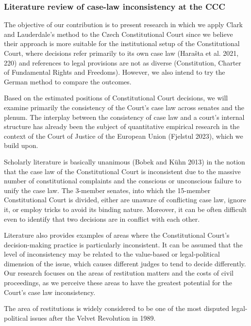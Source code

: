 \documentclass[
  11pt,
]{article}
\begin{document}
\hypertarget{literature-review-of-case-law-inconsistency-at-the-ccc}{%
\subsubsection{Literature review of case-law inconsistency at the
CCC}\label{literature-review-of-case-law-inconsistency-at-the-ccc}}

The objective of our contribution is to present research in which we
apply Clark and Lauderdale's method to the Czech Constitutional Court
since we believe their approach is more suitable for the institutional
setup of the Constitutional Court, where decisions refer primarily to
its own case law (Harašta et al. 2021, 220) and references to legal
provisions are not as diverse (Constitution, Charter of Fundamental
Rights and Freedoms). However, we also intend to try the German method
to compare the outcomes.

Based on the estimated positions of Constitutional Court decisions, we
will examine primarily the consistency of the Court's case law across
senates and the plenum. The interplay between the consistency of case
law and a court's internal structure has already been the subject of
quantitative empirical research in the context of the Court of Justice
of the European Union (Fjelstul 2023), which we build upon.

Scholarly literature is basically unanimous (Bobek and Kühn 2013) in the
notion that the case law of the Constitutional Court is inconsistent due
to the massive number of constitutional complaints and the conscious or
unconscious failure to unify the case law. The 3-member senates, into
which the 15-member Constitutional Court is divided, either are unaware
of conflicting case law, ignore it, or employ tricks to avoid its
binding nature. Moreover, it can be often difficult even to identify
that two decisions are in conflict with each other.

Literature also provides examples of areas where the Constitutional
Court's decision-making practice is particularly inconsistent. It can be
assumed that the level of inconsistency may be related to the
value-based or legal-political dimension of the issue, which causes
different judges to tend to decide differently. Our research focuses on
the areas of restitution matters and the costs of civil proceedings, as
we perceive these areas to have the greatest potential for the Court's
case law inconsistency.

The area of restitutions is widely considered to be one of the most
disputed legal-political issues after the Velvet Revolution in 1989.
\end{document}
